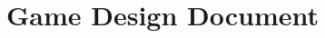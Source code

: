 \documentclass{article}
\title{\projectname Game Design Document}
\date{\docdate}
\author{\authorname}
\begin{document}
\maketitle
\newpage

\tableofcontents
\newpage













\newpage
\printglossary

\glsaddall
\end{document}
